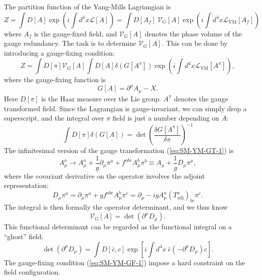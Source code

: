 \documentclass[aps,prb,superscriptaddress,nofootinbib]{revtex4}
\begin{document}
The partition function of the Yang-Mills Lagriangian is
\begin{equation}
	Z = \int D[A] \exp\left(i \int d^4x \mathcal{L}[A]\right)
	= \int D[A_{f}]\ \mathcal V_G[A] \exp\left(i \int d^4x \mathcal{L}_{\mathrm{YM}}[A_f]\right)
\end{equation}
where $A_f$ is the gauge-fixed field, and $\mathcal V_G[A]$ denotes the phase volume of the gauge redundancy.
The task is to determine $\mathcal V_G[A]$. 
This can be done by introducing a gauge-fixing condition:
\begin{equation}
	Z = \int D[\pi] \mathcal V_G[A]\int D[A] \delta(G[A^\pi]) \exp\left(i \int d^4x \mathcal{L}_{\mathrm{YM}}[A^\pi]\right),
\end{equation}
where the gauge-fixing function is 
\begin{equation}\label{eq:SM-YM-GF-1}
	G[A] = \partial^\mu A_\mu - X.
\end{equation}
Here $D[\pi]$ is the Haar measure over the Lie group.
$A^\pi$ denotes the gauge transformed field. 
Since the Lagrangian is gauge-invariant, we can simply drop a superscript, and the integral over $\pi$ field is just a number depending on $A$:
\begin{equation}
	\int D[\pi] \delta(G[A]) = \det\left(\frac{\delta G[A^\pi]}{\delta \pi}\right)^{-1}
\end{equation}
The infinitesimal version of the gauge transformation (\ref{eq:SM-YM-GT-1}) is
\begin{equation}
	A_\mu^a \rightarrow A_\mu^a +\frac{1}{g}\partial_\mu \pi^a + f^{abc}A^b_\mu \pi^b
	\equiv A_\mu + \frac{1}{g} D_\mu \pi^a,
\end{equation}
where the covariant derivative on the operator involves the adjoint representation:
\begin{equation}
	D_\mu \pi^a = \partial_\mu \pi^a + g f^{abc} A_\mu^b \pi^c = \partial_\mu -i g A_\mu^a \left(T^a_{\mathrm{adj}}\right)_{bc} \pi^c.
\end{equation}
The integral is then formally the operator determinant, and we thus know
\begin{equation}
	 \mathcal V_G[A] = \det(\partial^\mu D_\mu).
\end{equation}
This functional determinant can be regarded as the functional integral on a ``ghost'' field:
\begin{equation}
	\det(\partial^\mu D_\mu) = \int D[\bar c,c] \exp\left[i \int d^4 x\ \bar c (-\partial^\mu D_\mu)c \right].
\end{equation}
The gauge-fixing condition (\ref{eq:SM-YM-GF-1}) impose a hard constraint on the field configuration.
\end{document}
